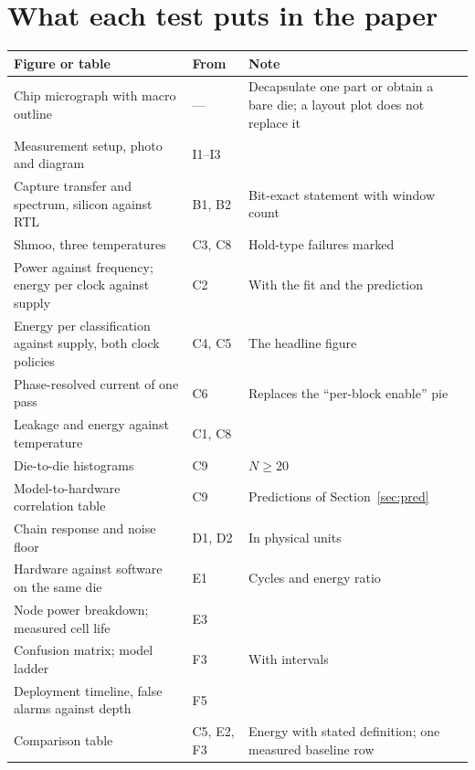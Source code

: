 \documentclass[10pt]{article}
\begin{document}
\section{What each test puts in the paper}
{\small
\begin{longtable}{@{}L{6.4cm}L{2.2cm}L{6.4cm}@{}}
\toprule
Figure or table & From & Note\\
\midrule
\endhead
Chip micrograph with macro outline & --- & Decapsulate one part or obtain a bare die; a layout plot does not replace it\\
Measurement setup, photo and diagram & I1--I3 & \\
Capture transfer and spectrum, silicon against RTL & B1, B2 & Bit-exact statement with window count\\
Shmoo, three temperatures & C3, C8 & Hold-type failures marked\\
Power against frequency; energy per clock against supply & C2 & With the fit and the prediction\\
Energy per classification against supply, both clock policies & C4, C5 & The headline figure\\
Phase-resolved current of one pass & C6 & Replaces the ``per-block enable'' pie\\
Leakage and energy against temperature & C1, C8 & \\
Die-to-die histograms & C9 & $N\ge20$\\
Model-to-hardware correlation table & C9 & Predictions of Section~\ref{sec:pred}\\
Chain response and noise floor & D1, D2 & In physical units\\
Hardware against software on the same die & E1 & Cycles and energy ratio\\
Node power breakdown; measured cell life & E3 & \\
Confusion matrix; model ladder & F3 & With intervals\\
Deployment timeline, false alarms against depth & F5 & \\
Comparison table & C5, E2, F3 & Energy with stated definition; one measured baseline row\\
\bottomrule
\end{longtable}}
\end{document}
